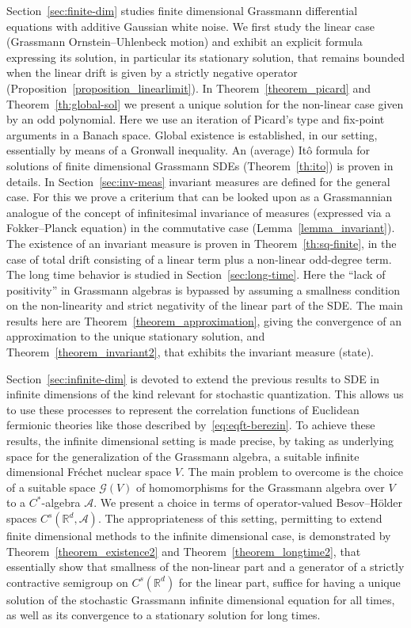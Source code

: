 \documentclass{article}
\begin{document}
Section~\ref{sec:finite-dim} studies finite dimensional Grassmann
differential equations with additive Gaussian white noise. We first study the
linear case (Grassmann Ornstein--Uhlenbeck motion) and exhibit an explicit
formula expressing its solution, in particular its stationary solution, that
remains bounded when the linear drift is given by a strictly negative operator
(Proposition~\ref{proposition_linearlimit}). In Theorem~\ref{theorem_picard}
and Theorem~\ref{th:global-sol} we present a unique solution for the
non-linear case given by an odd polynomial. Here we use an iteration of
Picard's type and fix-point arguments in a Banach space. Global existence is
established, in our setting, essentially by means of a Gronwall inequality. An
(average) It{\^o} formula for solutions of finite dimensional Grassmann SDEs
(Theorem~\ref{th:ito}) is proven in details. In Section~\ref{sec:inv-meas}
invariant measures are defined for the general case. For this we prove a
criterium that can be looked upon as a Grassmannian analogue of the concept of
infinitesimal invariance of measures (expressed via a Fokker--Planck equation)
in the commutative case (Lemma~\ref{lemma_invariant}). The existence of an
invariant measure is proven in Theorem~\ref{th:sq-finite}, in the case of
total drift consisting of a linear term plus a non-linear odd-degree term. The
long time behavior is studied in Section~\ref{sec:long-time}. Here the ``lack
of positivity'' in Grassmann algebras is bypassed by assuming a smallness
condition on the non-linearity and strict negativity of the linear part of the
SDE. The main results here are Theorem~\ref{theorem_approximation}, giving the
convergence of an approximation to the unique stationary solution, and
Theorem~\ref{theorem_invariant2}, that exhibits the invariant measure (state).

Section~\ref{sec:infinite-dim} is devoted to extend the previous results to
SDE in infinite dimensions of the kind relevant for stochastic quantization.
This allows us to use these processes to represent the correlation functions
of Euclidean fermionic theories like those described
by~{\eqref{eq:eqft-berezin}}. To achieve these results, the infinite
dimensional setting is made precise, by taking as underlying space for the
generalization of the Grassmann algebra, a suitable infinite dimensional
Fr{\'e}chet nuclear space $V$. The main problem to overcome is the choice of a
suitable space $\mathcal{G} (V)$ of homomorphisms for the Grassmann algebra
over $V$ to a $C^{\ast}$-algebra $\mathcal{A}$. We present a choice in terms
of operator-valued Besov--H{\"o}lder spaces $C^s (\mathbb{R}^d, \mathcal{A})$.
The appropriateness of this setting, permitting to extend finite dimensional
methods to the infinite dimensional case, is demonstrated by
Theorem~\ref{theorem_existence2} and Theorem~\ref{theorem_longtime2}, that
essentially show that smallness of the non-linear part and a generator of a
strictly contractive semigroup on $C^s (\mathbb{R}^d)$ for the linear part,
suffice for having a unique solution of the stochastic Grassmann infinite
dimensional equation for all times, as well as its convergence to a stationary
solution for long times.
\end{document}
